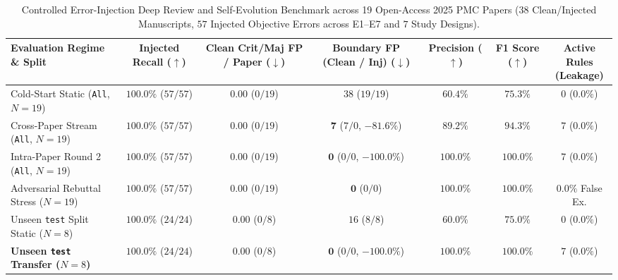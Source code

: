 \documentclass[11pt,a4paper]{article}
\makeatletter
\newcommand{\thead}[1]{\begin{tabular}[c]{@{}c@{}}#1\end{tabular}}
\makeatother
\begin{document}
\begin{table}[!t]
\centering
\caption{Controlled Error-Injection Deep Review and Self-Evolution Benchmark across 19 Open-Access 2025 PMC Papers ($38$ Clean/Injected Manuscripts, $57$ Injected Objective Errors across E1--E7 and $7$ Study Designs).}
\label{tab:deep_review_injection}
\vspace{2pt}
\small
\setlength{\tabcolsep}{0pt}
\begin{tabular*}{\textwidth}{@{\extracolsep{\fill}}lcccccc@{}}
\toprule
\textbf{Evaluation Regime \& Split} & \thead{\textbf{Injected}\\\textbf{Recall ($\uparrow$)}} & \thead{\textbf{Clean Crit/Maj}\\\textbf{FP / Paper ($\downarrow$)}} & \thead{\textbf{Boundary FP}\\\textbf{(Clean / Inj) ($\downarrow$)}} & \thead{\textbf{Precision}\\\textbf{($\uparrow$)}} & \thead{\textbf{F1 Score}\\\textbf{($\uparrow$)}} & \thead{\textbf{Active Rules}\\\textbf{(Leakage)}} \\
\midrule
Cold-Start Static (\texttt{All}, $N=19$) & $\mathbf{100.0\%}$ ($57/57$) & $\mathbf{0.00}$ ($0/19$) & $38$ ($19 / 19$) & $60.4\%$ & $75.3\%$ & $0$ ($0.0\%$) \\
Cross-Paper Stream (\texttt{All}, $N=19$) & $\mathbf{100.0\%}$ ($57/57$) & $\mathbf{0.00}$ ($0/19$) & $\mathbf{7}$ ($7 / 0$, $\mathbf{-81.6\%}$) & $\mathbf{89.2\%}$ & $\mathbf{94.3\%}$ & $7$ ($\mathbf{0.0\%}$) \\
Intra-Paper Round 2 (\texttt{All}, $N=19$) & $\mathbf{100.0\%}$ ($57/57$) & $\mathbf{0.00}$ ($0/19$) & $\mathbf{0}$ ($0 / 0$, $\mathbf{-100.0\%}$) & $\mathbf{100.0\%}$ & $\mathbf{100.0\%}$ & $7$ ($\mathbf{0.0\%}$) \\
Adversarial Rebuttal Stress ($N=19$) & $\mathbf{100.0\%}$ ($57/57$) & $\mathbf{0.00}$ ($0/19$) & $\mathbf{0}$ ($0 / 0$) & $\mathbf{100.0\%}$ & $\mathbf{100.0\%}$ & $\mathbf{0.0\%}$ False Ex. \\
\midrule
Unseen \texttt{test} Split Static ($N=8$) & $\mathbf{100.0\%}$ ($24/24$) & $\mathbf{0.00}$ ($0/8$) & $16$ ($8 / 8$) & $60.0\%$ & $75.0\%$ & $0$ ($0.0\%$) \\
\textbf{Unseen \texttt{test} Transfer ($N=8$)} & $\mathbf{100.0\%}$ ($24/24$) & $\mathbf{0.00}$ ($0/8$) & $\mathbf{0}$ ($0 / 0$, $\mathbf{-100.0\%}$) & $\mathbf{100.0\%}$ & $\mathbf{100.0\%}$ & $7$ ($\mathbf{0.0\%}$) \\

\end{tabular*}
\end{table}
\end{document}
